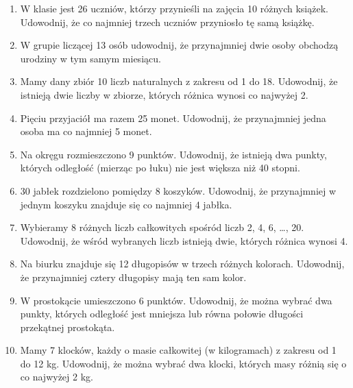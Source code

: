 \documentclass[12pt]{article}
\begin{document}
\begin{enumerate} 	\item %
	W klasie jest 26 uczniów, którzy przynieśli na zajęcia 10 różnych książek. Udowodnij, że co najmniej trzech uczniów przyniosło tę samą książkę.
	
	\item
	W grupie liczącej 13 osób udowodnij, że przynajmniej dwie osoby obchodzą urodziny w tym samym miesiącu.
	
	\item
	Mamy dany zbiór 10 liczb naturalnych z zakresu od 1 do 18. Udowodnij, że istnieją dwie liczby w zbiorze, których różnica wynosi co najwyżej 2.
	
	\item
	Pięciu przyjaciół ma razem 25 monet. Udowodnij, że przynajmniej jedna osoba ma co najmniej 5 monet.
	
	\item
	Na okręgu rozmieszczono 9 punktów. Udowodnij, że istnieją dwa punkty, których odległość (mierząc po łuku) nie jest większa niż 40 stopni.
	
	\item
	30 jabłek rozdzielono pomiędzy 8 koszyków. Udowodnij, że przynajmniej w jednym koszyku znajduje się co najmniej 4 jabłka.
	
	\item
	Wybieramy 8 różnych liczb całkowitych spośród liczb 2, 4, 6, …, 20. Udowodnij, że wśród wybranych liczb istnieją dwie, których różnica wynosi 4.
	
	\item
	Na biurku znajduje się 12 długopisów w trzech różnych kolorach. Udowodnij, że przynajmniej cztery długopisy mają ten sam kolor.
	
	\item
	W prostokącie umieszczono 6 punktów. Udowodnij, że można wybrać dwa punkty, których odległość jest mniejsza lub równa połowie długości przekątnej prostokąta.
	
	\item
	Mamy 7 klocków, każdy o masie całkowitej (w kilogramach) z zakresu od 1 do 12 kg. Udowodnij, że można wybrać dwa klocki, których masy różnią się o co najwyżej 2 kg.
	
\end{enumerate}
\end{document}
